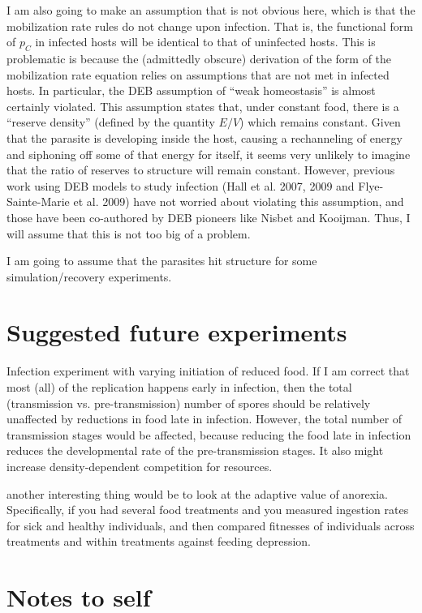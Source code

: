 \documentclass[12pt,reqno,final,pdftex]{amsart}\usepackage[]{graphicx}\usepackage[]{color}
\theoremstyle{plain}
\numberwithin{equation}{part}
\begin{document}
I am also going to make an assumption that is not obvious here, which is that the mobilization rate rules do not change upon infection.
That is, the functional form of $p_C$ in infected hosts will be identical to that of uninfected hosts.
This is problematic is because the (admittedly obscure) derivation of the form of the mobilization rate equation relies on assumptions that are not met in infected hosts.
In particular, the DEB assumption of ``weak homeostasis'' is almost certainly violated.
This assumption states that, under constant food, there is a ``reserve density'' (defined by the quantity $E/V$) which remains constant.
Given that the parasite is developing inside the host, causing a rechanneling of energy and siphoning off some of that energy for itself, it seems very unlikely to imagine that the ratio of reserves to structure will remain constant.
However, previous work using DEB models to study infection (Hall et al. 2007, 2009 and Flye-Sainte-Marie et al. 2009) have not worried about violating this assumption, and those have been co-authored by DEB pioneers like Nisbet and Kooijman.
Thus, I will assume that this is not too big of a problem.

I am going to assume that the parasites hit structure for some simulation/recovery experiments.





\section*{Suggested future experiments}
Infection experiment with varying initiation of reduced food.
If I am correct that most (all) of the replication happens early in infection, then the total (transmission vs. pre-transmission) number of spores should be relatively unaffected by reductions in food late in infection.
However, the total number of transmission stages would be affected, because reducing the food late in infection reduces the developmental rate of the pre-transmission stages.
It also might increase density-dependent competition for resources.

another interesting thing would be to look at the adaptive value of anorexia.
Specifically, if you had several food treatments and you measured ingestion rates for sick and healthy individuals, and then compared fitnesses of individuals across treatments and within treatments against feeding depression.

\section*{Notes to self}
\end{document}
